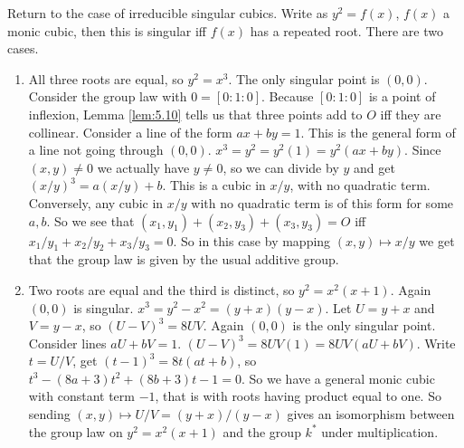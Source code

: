 \documentclass{article}
\newcommand{\rb}[1]{\left( #1 \right)}
\renewcommand{\sb}[1]{\left[ #1 \right]}
\theoremstyle{definition}\newtheorem{definition}{Definition}[section]
\theoremstyle{definition}\newtheorem{remark}[definition]{Remark}
\theoremstyle{definition}\newtheorem*{example}{Example}
\theoremstyle{definition}\newtheorem*{note}{Note}
\begin{document}
Return to the case of irreducible singular cubics. Write as $ y^2 = f\rb{x} $, $ f\rb{x} $ a monic cubic, then this is singular iff $ f\rb{x} $ has a repeated root. There are two cases.
\begin{enumerate}
\item All three roots are equal, so $ y^2 = x^3 $. The only singular point is $ \rb{0, 0} $. Consider the group law with $ 0 = \sb{0 : 1 : 0} $. Because $ \sb{0 : 1 : 0} $ is a point of inflexion, Lemma \ref{lem:5.10} tells us that three points add to $ O $ iff they are collinear. Consider a line of the form $ ax + by = 1 $. This is the general form of a line not going through $ \rb{0, 0} $. $ x^3 = y^2 = y^2\rb{1} = y^2\rb{ax + by} $. Since $ \rb{x, y} \ne 0 $ we actually have $ y \ne 0 $, so we can divide by $ y $ and get $ \rb{x / y}^3 = a\rb{x / y} + b $. This is a cubic in $ x / y $, with no quadratic term. Conversely, any cubic in $ x / y $ with no quadratic term is of this form for some $ a, b $. So we see that $ \rb{x_1, y_1} + \rb{x_2, y_3} + \rb{x_3, y_3} = O $ iff $ x_1 / y_1 + x_2 / y_2 + x_3 / y_3 = 0 $. So in this case by mapping $ \rb{x, y} \mapsto x / y $ we get that the group law is given by the usual additive group.
\item Two roots are equal and the third is distinct, so $ y^2 = x^2\rb{x + 1} $. Again $ \rb{0, 0} $ is singular. $ x^3 = y^2 - x^2 = \rb{y + x}\rb{y - x} $. Let $ U = y + x $ and $ V = y - x $, so $ \rb{U - V}^3 = 8UV $. Again $ \rb{0, 0} $ is the only singular point. Consider lines $ aU + bV = 1 $. $ \rb{U - V}^3 = 8UV\rb{1} = 8UV\rb{aU + bV} $. Write $ t = U / V $, get $ \rb{t - 1}^3 = 8t\rb{at + b} $, so $ t^3 - \rb{8a + 3}t^2 + \rb{8b + 3}t - 1 = 0 $. So we have a general monic cubic with constant term $ -1 $, that is with roots having product equal to one. So sending $ \rb{x, y} \mapsto U / V = \rb{y + x} / \rb{y - x} $ gives an isomorphism between the group law on $ y^2 = x^2\rb{x + 1} $ and the group $ k^* $ under multiplication.
\end{enumerate}

\end{document}
